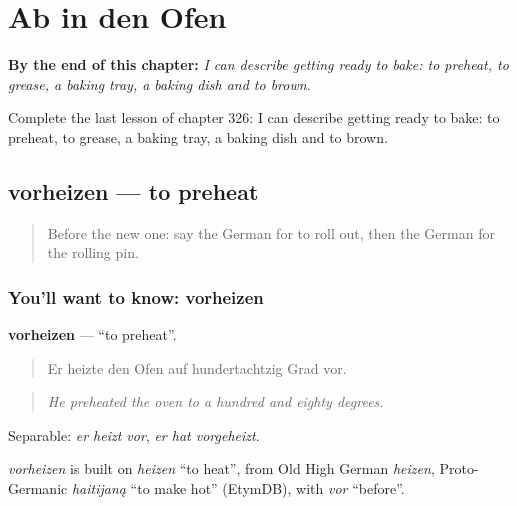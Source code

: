 
\chapter{Ab in den Ofen}
\label{ch:ge-ab-in-den-ofen}

\begin{chapteropening}
\textbf{By the end of this chapter:} \emph{I can describe getting ready to bake: to preheat, to grease, a baking tray, a baking dish and to brown.}

Complete the last lesson of chapter 326: I can describe getting ready to bake: to preheat, to grease, a baking tray, a baking dish and to brown.
\end{chapteropening}

\section[vorheizen]{vorheizen — to preheat}

\label{lesson:GE-C326-vorheizen}



\begin{quote}
Before the new one: say the German for to roll out, then the German for the rolling pin.
\end{quote}

\subsection*{You'll want to know: vorheizen}
\textbf{vorheizen} — \textquotedblleft{}to preheat\textquotedblright{}.

\begin{quote}
Er heizte den Ofen auf hundertachtzig Grad vor.
\end{quote}

\begin{quote}
\emph{He preheated the oven to a hundred and eighty degrees.}
\end{quote}

Separable: \emph{er heizt vor}, \emph{er hat vorgeheizt}.

\begin{cousinweb}
\emph{vorheizen} is built on \emph{heizen} \textquotedblleft{}to heat\textquotedblright{}, from Old High German \emph{heizen}, Proto-Germanic \emph{haitijaną} \textquotedblleft{}to make hot\textquotedblright{} (EtymDB), with \emph{vor} \textquotedblleft{}before\textquotedblright{}.
\end{cousinweb}

